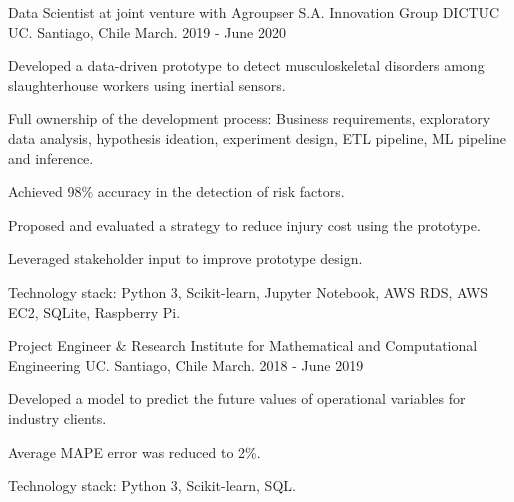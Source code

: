 

\begin{cventries}


\cventry
{Data Scientist at joint venture with Agroupser S.A. Innovation Group} %
{DICTUC UC.} %
{Santiago, Chile} %
{March. 2019 - June 2020} %
{
  \begin{cvitems} %
    \item {Developed a data-driven prototype to detect musculoskeletal disorders among slaughterhouse workers using 
    inertial sensors.}
    \item {Full ownership of the development process: Business requirements, exploratory data analysis, hypothesis ideation, experiment design, ETL pipeline, ML pipeline and inference.}
    \item {Achieved 98\% accuracy in the detection of risk factors.}
    \item {Proposed and evaluated a strategy to reduce injury cost using the prototype.}
    \item {Leveraged stakeholder input to improve prototype design.}
    \item {Technology stack: Python 3, Scikit-learn, Jupyter Notebook, AWS RDS, AWS EC2, SQLite, Raspberry Pi.}
  \end{cvitems}
}
\cventry
{Project Engineer \& Research} %
{Institute for Mathematical and Computational Engineering UC.} %
{Santiago, Chile} %
{March. 2018 - June 2019} %
{
  \begin{cvitems} %
    \item {Developed a model to predict the future values of operational variables for industry clients}.
    \item {Average MAPE error was reduced to 2\%.}
    \item {Technology stack: Python 3, Scikit-learn, SQL.}
  \end{cvitems}
}


\end{cventries}
